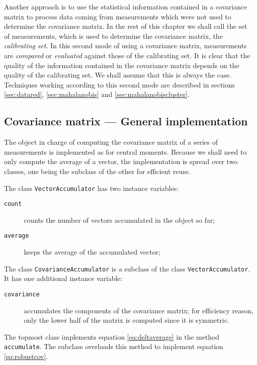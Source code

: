 \documentclass[twoside]{book}
\begin{document}
Another approach is to use the statistical information contained
in a covariance matrix to process data coming from measurements
which were not used to determine the covariance matrix. In the
rest of this chapter we shall call the set of measurements, which
is used to determine the covariance matrix, the {\sl calibrating
set}. In this second mode of using a covariance matrix,
measurements are {\sl compared} or {\sl evaluated} against those
of the calibrating set. It is clear that the quality of the
information contained in the covariance matrix depends on the
quality of the calibrating set. We shall assume that this is
always the case. Techniques working according to this second mode
are described in sections \ref{sec:datared}, \ref{sec:mahalanobis}
and \ref{sec:mahalanobiscluster}.

\subsection{Covariance matrix --- General implementation}
 The
object in charge of computing the covariance matrix of a series of
measurements is implemented as for central moments. Because we
shall need to only compute the average of a vector, the
implementation is spread over two classes, one being the subclass
of the other for efficient reuse.

\noindent The class {\tt VectorAccumulator} has two instance
variables: {} {\parskip 0pt
\begin{description}
  \item[\tt count] counts the number of vectors accumulated in the object so far;
  \item[\tt average] keeps the average of the accumulated vector;
\end{description}
}

\noindent The class {\tt CovarianceAccumulator} is a subclass of
the class {\tt VectorAccumulator}. It has one additional instance
variable: {} {\parskip 0pt
\begin{description}
  \item[\tt covariance] accumulates the components of the covariance
  matrix; for efficiency reason, only the lower half of the matrix
  is computed since it is symmetric.
\end{description}
}

The topmost class implements equation \ref{eq:deltaverage} in the
method {\tt accumulate}. The subclass overloads this method to
implement equation \ref{eq:robustcov}.
\end{document}
